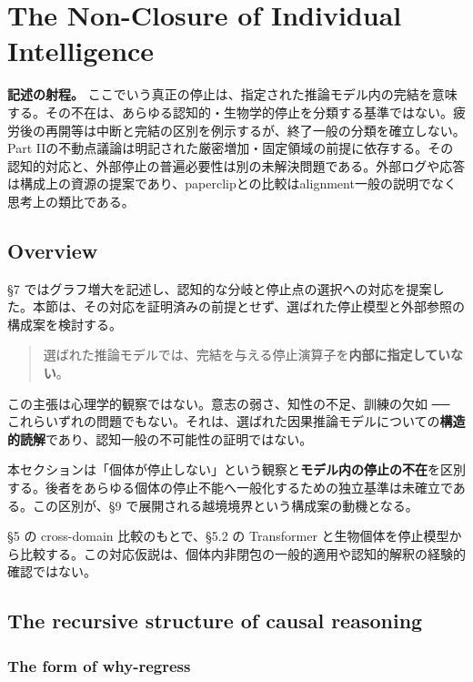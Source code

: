 \section{The Non-Closure of Individual Intelligence}

\noindent\textbf{記述の射程。} ここでいう真正の停止は、指定された推論モデル内の完結を意味する。その不在は、あらゆる認知的・生物学的停止を分類する基準ではない。疲労後の再開等は中断と完結の区別を例示するが、終了一般の分類を確立しない。Part IIの不動点議論は明記された厳密増加・固定領域の前提に依存する。その認知的対応と、外部停止の普遍必要性は別の未解決問題である。外部ログや応答は構成上の資源の提案であり、paperclipとの比較はalignment一般の説明でなく思考上の類比である。



\subsection{Overview}


\S{}7 ではグラフ増大を記述し、認知的な分岐と停止点の選択への対応を提案した。本節は、その対応を証明済みの前提とせず、選ばれた停止模型と外部参照の構成案を検討する。

\begin{quote}
選ばれた推論モデルでは、完結を与える停止演算子を\textbf{内部に指定していない}。
\end{quote}

この主張は心理学的観察ではない。意志の弱さ、知性の不足、訓練の欠如 ── これらいずれの問題でもない。それは、選ばれた因果推論モデルについての\textbf{構造的読解}であり、認知一般の不可能性の証明ではない。

本セクションは「個体が停止しない」という観察と\textbf{モデル内の停止の不在}を区別する。後者をあらゆる個体の停止不能へ一般化するための独立基準は未確立である。この区別が、\S{}9 で展開される越境境界という構成案の動機となる。

\S{}5 の cross-domain 比較のもとで、\S{}5.2 の Transformer と生物個体を停止模型から比較する。この対応仮説は、個体内非閉包の一般的適用や認知的解釈の経験的確認ではない。

\subsection{The recursive structure of causal reasoning}


\subsubsection{The form of why-regress}


